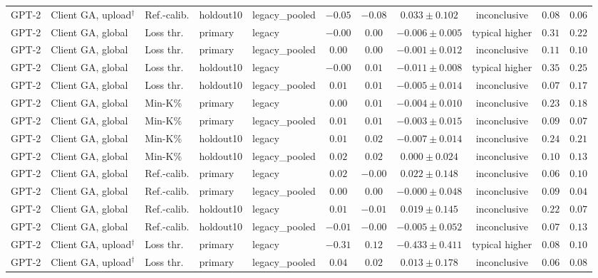 \begin{table}[t]
\begin{tabular*}{\textwidth}{@{\extracolsep{\fill}}lllllcccccc@{}}
GPT-2 & Client GA, upload$^{\dagger}$ & Ref.-calib. & holdout10 & legacy\_pooled & $-0.05$ & $-0.08$ & $0.033 \pm 0.102$ & inconclusive & $0.08$ & $0.06$ \\
GPT-2 & Client GA, global & Loss thr. & primary & legacy & $-0.00$ & $0.00$ & $-0.006 \pm 0.005$ & typical higher & $0.31$ & $0.22$ \\
GPT-2 & Client GA, global & Loss thr. & primary & legacy\_pooled & $0.00$ & $0.00$ & $-0.001 \pm 0.012$ & inconclusive & $0.11$ & $0.10$ \\
GPT-2 & Client GA, global & Loss thr. & holdout10 & legacy & $-0.00$ & $0.01$ & $-0.011 \pm 0.008$ & typical higher & $0.35$ & $0.25$ \\
GPT-2 & Client GA, global & Loss thr. & holdout10 & legacy\_pooled & $0.01$ & $0.01$ & $-0.005 \pm 0.014$ & inconclusive & $0.07$ & $0.17$ \\
GPT-2 & Client GA, global & Min-K\% & primary & legacy & $0.00$ & $0.01$ & $-0.004 \pm 0.010$ & inconclusive & $0.23$ & $0.18$ \\
GPT-2 & Client GA, global & Min-K\% & primary & legacy\_pooled & $0.01$ & $0.01$ & $-0.003 \pm 0.015$ & inconclusive & $0.09$ & $0.07$ \\
GPT-2 & Client GA, global & Min-K\% & holdout10 & legacy & $0.01$ & $0.02$ & $-0.007 \pm 0.014$ & inconclusive & $0.24$ & $0.21$ \\
GPT-2 & Client GA, global & Min-K\% & holdout10 & legacy\_pooled & $0.02$ & $0.02$ & $0.000 \pm 0.024$ & inconclusive & $0.10$ & $0.13$ \\
GPT-2 & Client GA, global & Ref.-calib. & primary & legacy & $0.02$ & $-0.00$ & $0.022 \pm 0.148$ & inconclusive & $0.06$ & $0.10$ \\
GPT-2 & Client GA, global & Ref.-calib. & primary & legacy\_pooled & $0.00$ & $0.00$ & $-0.000 \pm 0.048$ & inconclusive & $0.09$ & $0.04$ \\
GPT-2 & Client GA, global & Ref.-calib. & holdout10 & legacy & $0.01$ & $-0.01$ & $0.019 \pm 0.145$ & inconclusive & $0.22$ & $0.07$ \\
GPT-2 & Client GA, global & Ref.-calib. & holdout10 & legacy\_pooled & $-0.01$ & $-0.00$ & $-0.005 \pm 0.052$ & inconclusive & $0.07$ & $0.13$ \\
GPT-2 & Client GA, upload$^{\dagger}$ & Loss thr. & primary & legacy & $-0.31$ & $0.12$ & $-0.433 \pm 0.411$ & typical higher & $0.08$ & $0.10$ \\
GPT-2 & Client GA, upload$^{\dagger}$ & Loss thr. & primary & legacy\_pooled & $0.04$ & $0.02$ & $0.013 \pm 0.178$ & inconclusive & $0.06$ & $0.08$ \\

\end{tabular*}
\end{table}
